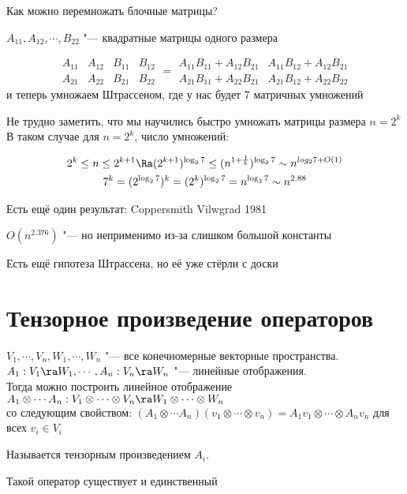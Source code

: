 Как можно перемножать блочные матрицы?

$A_{11}, A_{12}, \cdots, B_{22}$  "--- квадратные матрицы одного размера

$$\begin{matrix}
        A_{11} & A_{12} \\
        A_{21} & A_{22}
    \end{matrix}
    \begin{matrix}
        B_{11} & B_{12} \\
        B_{21} & B_{22}
    \end{matrix} = 
    \begin{matrix}
        A_{11}B_{11} + A_{12}B_{21} & A_{11}B_{12} + A_{12}B_{21} \\
        A_{21}B_{11} + A_{22}B_{21} & A_{21}B_{12} + A_{22}B_{22}
    \end{matrix}$$
и теперь умножаем Штрассеном, где у нас будет 7 матричных умножений

Не трудно заметить, что мы научились быстро умножать матрицы размера $n = 2^k$
В таком случае для $n = 2^k$, число умножений:

    \begin{gather*}
        2^k \leq n \leq 2^{k+1} \Ra (2^{k+1})^{\log_2 7} \leq (n^{1 + \frac{1}{k}})^{\log_2 7} \sim n^{log_2 7 + O(1)} \\
        7^k = (2^{\log_2 7})^k = (2^k)^{\log_2 7} = n^{\log_2 7} \sim n^{2.88}
    \end{gather*}

Есть ещё один результат: Coppersmith Vilwgrad 1981

$O(n^{2.376})$ "--- но неприменимо из-за слишком большой константы

Есть ещё гипотеза Штрассена, но её уже стёрли с доски

\section{Тензорное произведение операторов}
\begin{Def}
$V_1, \cdots, V_n, W_1, \cdots, W_n$ "--- все конечномерные векторные пространства.\\
$A_1: V_1 \ra W_1, \cdots, A_n: V_n \ra W_n$  "--- линейные отображения.\\

Тогда можно построить линейное отображение
$A_1 \otimes \cdots A_n: V_1 \otimes \cdots \otimes V_n \ra W_1 \otimes \cdots \otimes W_n$\\
со следующим свойством:
$(A_1 \otimes \cdots A_n)(v_1 \otimes \cdots \otimes v_n) = A_1 v_1 \otimes \cdots \otimes A_n v_n$
для всех $v_i \in V_i$

Называется тензорным произведением $A_i$.
\end{Def}
\begin{theorem}
    Такой оператор существует и единственный
\end{theorem}

